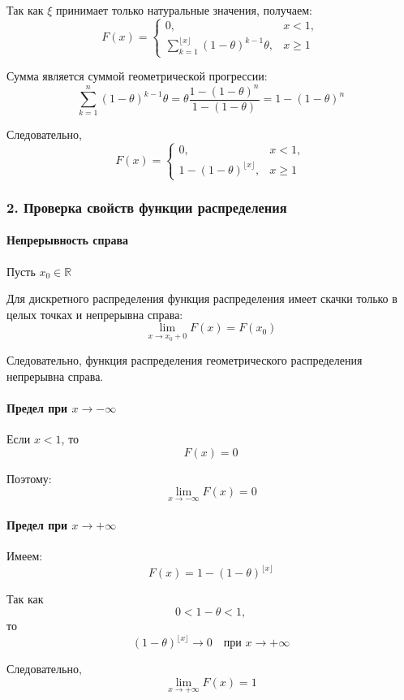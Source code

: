 \documentclass[12pt,a4paper]{article}
\theoremstyle{definition}
\begin{document}
Так как $\xi$ принимает только натуральные значения, получаем:
\[F(x)=\begin{cases}0, & x<1,\\[1ex]\displaystyle\sum_{k=1}^{\lfloor x \rfloor}(1-\theta)^{k-1}\theta,& x\ge1\end{cases}\]

Сумма является суммой геометрической прогрессии:
\[\sum_{k=1}^{n}(1-\theta)^{k-1}\theta=\theta\frac{1-(1-\theta)^n}{1-(1-\theta)}=1-(1-\theta)^n\]

Следовательно,
\[F(x)=\begin{cases}0, & x<1,\\[1ex]1-(1-\theta)^{\lfloor x \rfloor},& x\ge1\end{cases}\]

\subsubsection*{2. Проверка свойств функции распределения}

\paragraph{Непрерывность справа}

Пусть $x_0\in\mathbb R$

Для дискретного распределения функция распределения имеет скачки только в целых точках и непрерывна справа:
\[\lim_{x\to x_0+0}F(x)=F(x_0)\]

Следовательно, функция распределения геометрического распределения непрерывна справа.

\paragraph{Предел при $x\to-\infty$}

Если $x<1$, то
\[F(x)=0\]

Поэтому:
\[\lim_{x\to-\infty}F(x)=0\]

\paragraph{Предел при $x\to+\infty$}

Имеем:
\[F(x)=1-(1-\theta)^{\lfloor x\rfloor}\]

Так как\[0<1-\theta<1,\] то
\[(1-\theta)^{\lfloor x\rfloor}\to0 \quad \text{при } x\to+\infty\]

Следовательно,
\[\lim_{x\to+\infty}F(x)=1\]
\end{document}
